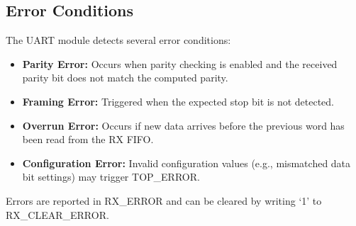 \subsection{Error Conditions}

The UART module detects several error conditions:
\begin{itemize}[noitemsep]
    \item \textbf{Parity Error:} Occurs when parity checking is enabled and the received parity bit does not match the computed parity.
    \item \textbf{Framing Error:} Triggered when the expected stop bit is not detected.
    \item \textbf{Overrun Error:} Occurs if new data arrives before the previous word has been read from the RX FIFO.
    \item \textbf{Configuration Error:} Invalid configuration values (e.g., mismatched data bit settings) may trigger TOP\_ERROR.
\end{itemize}
Errors are reported in RX\_ERROR and can be cleared by writing ‘1’ to RX\_CLEAR\_ERROR.

